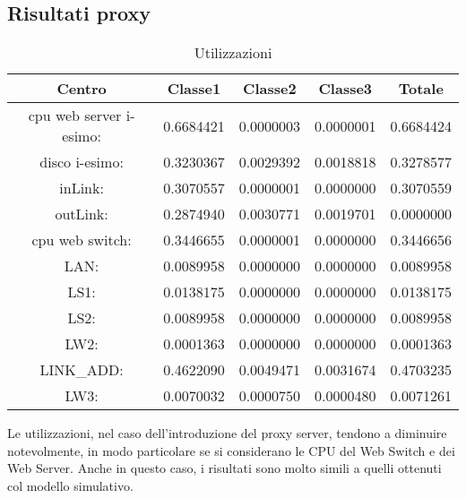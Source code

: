 \subsection{Risultati proxy}
\begin{table}[H]
\begin{center}
\begin{tabular}{||c|c|c|c|c||}
\hline
Centro &Classe1 &Classe2 &Classe3 &Totale\\
\hline
\hline
 cpu web server i-esimo: 	&0.6684421	&0.0000003	&0.0000001	&0.6684424	\\\hline
 disco i-esimo: 	&0.3230367	&0.0029392	&0.0018818	&0.3278577	\\\hline
 inLink: 	&0.3070557	&0.0000001	&0.0000000	&0.3070559	\\\hline
 outLink: 	&0.2874940	&0.0030771	&0.0019701	&0.0000000	\\\hline
 cpu web switch: 	&0.3446655	&0.0000001	&0.0000000	&0.3446656	\\\hline
 LAN: 	&0.0089958	&0.0000000	&0.0000000	&0.0089958	\\\hline
 LS1: 	&0.0138175	&0.0000000	&0.0000000	&0.0138175	\\\hline
 LS2:	&0.0089958	&0.0000000	&0.0000000	&0.0089958	\\\hline
 LW2: 	&0.0001363	&0.0000000	&0.0000000	&0.0001363	\\\hline
 LINK\_ADD: 	&0.4622090	&0.0049471	&0.0031674	&0.4703235	\\\hline
 LW3: 	&0.0070032	&0.0000750	&0.0000480	&0.0071261	\\\hline
\end{tabular}
\end{center}
\caption{Utilizzazioni}
\label{utilizzazioni}
\end{table}
Le utilizzazioni, nel caso dell'introduzione del proxy server, tendono a diminuire notevolmente, in modo particolare se si considerano le CPU del Web Switch e dei Web Server. Anche in questo caso, i risultati sono molto simili a quelli ottenuti col modello simulativo.
